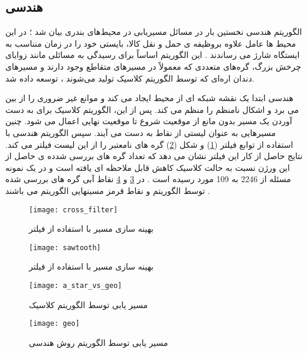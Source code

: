 \subsection{هندسی}
الگوریتم هندسی  نخستین بار در مسائل مسیریابی در محیط‌های بندری بیان شد ؛ در این محیط ها عامل علاوه بروظیفه ی حمل و نقل کالا، بایستی خود را در زمان منناسب به ایستگاه شارژ می رساندند . این الگوریتم اساساً برای رسیدگی به مسائلی مانند زوایای چرخش بزرگ، گره‌های متعددی که معمولاً در مسیرهای متقاطع وجود دارند و مسیرهای دندان اره‌ای که توسط الگوریتم کلاسیک   تولید می‌شوند ، توسعه داده شد.  
\par
{} هندسی ابتدا یک نقشه شبکه ای از محیط ایجاد می کند و موانع غیر ضروری را از بین می برد و اشکال نامنظم را منظم می کند. پس از این، الگوریتم کلاسیک   برای به دست آوردن یک مسیر بدون مانع از موقعیت شروع تا موقعیت نهایی اعمال می شود. چنین مسیرهایی به عنوان لیستی از نقاط به دست می آیند. سپس الگوریتم هندسی   با استفاده از توابع فیلتر
(\ref{crosspath:fig1})
و
شکل 
(\ref{sawtooth:fig2})
گره های نامعتبر را از این لیست فیلتر می کند. نتایج حاصل از کار این فیلتر نشان می دهد که تعداد گره های بررسی شدده ی حاصل از این ورژن نسبت به حالت کلاسیک کاهش قابل ملاحظه ای یافته است و در یک نمونه مسئله از 2246 به 109 مورد رسیده است . در 
\ref{a_star}
و
\ref{geo}
نقاط آبی گره های بررسی شده توسط الگوریتم و نقاط قرمز مسینهایی الگوریتم می باشند .

\begin{figure}[h]
	\texttt{[image: cross\_filter]}
	\centering
	\caption{بهینه سازی  مسیر با استفاده از فیلتر }
	\cite{paliwal2023survey}
	\label{crosspath:fig1}
\end{figure} 

\begin{figure}[h]
	\texttt{[image: sawtooth]}
	\centering
	\caption{بهینه سازی  مسیر با استفاده از فیلتر }
	\cite{paliwal2023survey}
	\label{sawtooth:fig2}
\end{figure}
\begin{figure}[h]
	\texttt{[image: a\_star\_vs\_geo]}
	\centering
	\caption{مسیر یابی توسط الگوریتم کلاسیک }
	\cite{paliwal2023survey}
	\label{a_star}
\end{figure}

\begin{figure}[h]
	\texttt{[image: geo]}
	\centering
	\caption{ مسیر یابی توسط الگوریتم روش هندسی }
	\cite{paliwal2023survey}
	\label{geo}
\end{figure}